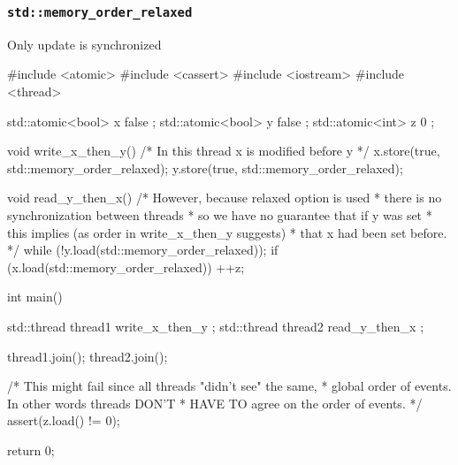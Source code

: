 \documentclass[../main]{subfiles}
\begin{document}
\subsubsection{\texttt{std::memory\_order\_relaxed}}
    Only update is synchronized
\begin{Code}
    #include <atomic>
    #include <cassert>
    #include <iostream>
    #include <thread>

    std::atomic<bool> x{ false };
    std::atomic<bool> y{ false };
    std::atomic<int> z{ 0 };

    void write_x_then_y()
    {
        /* In this thread x is modified before y */
        x.store(true, std::memory_order_relaxed);
        y.store(true, std::memory_order_relaxed);
    }

    void read_y_then_x()
    {
        /* However, because relaxed option is used
         * there is no synchronization between threads
         * so we have no guarantee that if y was set
         * this implies (as order in write_x_then_y suggests)
         * that x had been set before.
         */
        while (!y.load(std::memory_order_relaxed));
        if (x.load(std::memory_order_relaxed))
        {
            ++z;
        }
    }

    int main()
    {
        std::thread thread1{ write_x_then_y };
        std::thread thread2{ read_y_then_x };

        thread1.join();
        thread2.join();

        /* This might fail since all threads "didn't see" the same,
         * global order of events. In other words threads DON'T
         * HAVE TO agree on the order of events.
         */
        assert(z.load() != 0);

        return 0;
    }
\end{Code}
\end{document}
